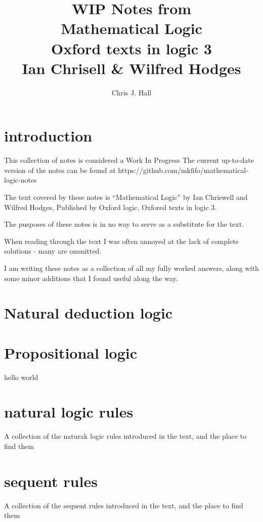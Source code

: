 \documentclass[a4paper, titlepage]{report}
\begin{document}
\title {WIP Notes from \\ Mathematical Logic \\ Oxford texts in logic 3 \\ Ian Chrisell \& Wilfred Hodges}
\author {Chris J. Hall}
\maketitle


\tableofcontents

\chapter{introduction}

This collection of notes is considered a Work In Progress
The current up-to-date version of the notes can be found at https://github.com/mkfifo/mathematical-logic-notes


The text covered by these notes is ``Mathematical Logic'' by Ian Chriswell and Wilfred Hodges,
Published by Oxford logic, Oxfored texts in logic 3.

The pusposes of these notes is in no way to serve as a substitute for the text.

When reading through the text I was often annoyed at the lack of complete solutions - many are ommitted.


I am writing these notes as a collection of all my fully worked answers, along with some minor additions that I found useful
along the way.


\chapter{Natural deduction logic}




\chapter{Propositional logic}

hello world


\chapter{natural logic rules}
A collection of the naturak logic rules introduced in the text, and the place to find them

\chapter{sequent rules}
A collection of the sequent rules introduced in the text, and the place to find them
\end{document}
